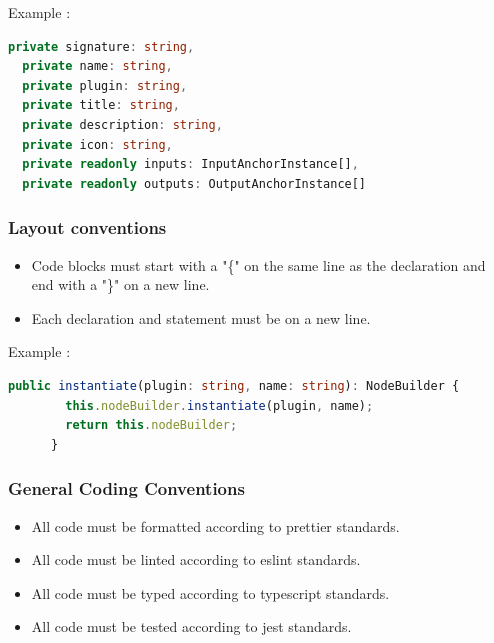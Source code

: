 \documentclass[11pt,a4paper]{article}
\begin{document}
Example :

\begin{lstlisting}[language=TypeScript]
  private signature: string,
  private name: string,
  private plugin: string,
  private title: string,
  private description: string,
  private icon: string,
  private readonly inputs: InputAnchorInstance[],
  private readonly outputs: OutputAnchorInstance[]
\end{lstlisting}

\subsubsection*{Layout conventions}

\begin{itemize}
    \item[\textbullet] Code blocks must start with a "\{" on the same line as the declaration and end with a "\}" on a new line.
    \item[\textbullet] Each declaration and statement must be on a new line.
\end{itemize}

Example :

\begin{lstlisting}[language=TypeScript]
    public instantiate(plugin: string, name: string): NodeBuilder {
        this.nodeBuilder.instantiate(plugin, name);
        return this.nodeBuilder;
      }
\end{lstlisting}


\subsubsection*{General Coding Conventions}

\begin{itemize}
    \item[\textbullet] All code must be formatted according to prettier standards.
    \item[\textbullet] All code must be linted according to eslint standards.
    \item[\textbullet] All code must be typed according to typescript standards.
    \item[\textbullet] All code must be tested according to jest standards.
\end{itemize}
\end{document}
